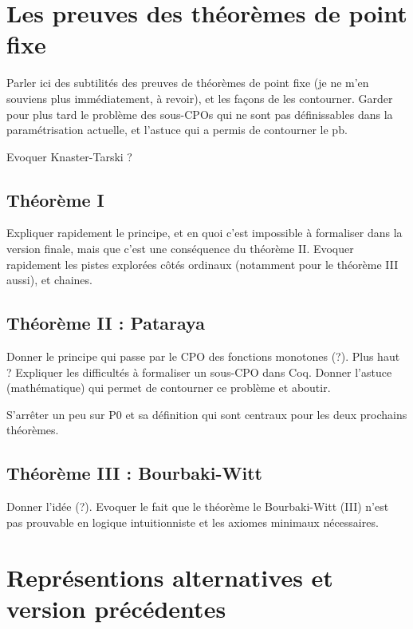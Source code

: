 \documentclass{article}
\theoremstyle{definition}
\begin{document}
\section{Les preuves des théorèmes de point fixe}


Parler ici des subtilités des preuves de théorèmes de point fixe (je ne m'en souviens plus immédiatement, à revoir), et les façons de les contourner. Garder pour plus tard le problème des sous-CPOs qui ne sont pas définissables dans la paramétrisation actuelle, et l'astuce qui a permis de contourner le pb.


Evoquer Knaster-Tarski ?

\subsection{Théorème I}

Expliquer rapidement le principe, et en quoi c'est impossible à formaliser dans la version finale, mais que c'est une conséquence du théorème II. Evoquer rapidement les pistes explorées côtés ordinaux (notamment pour le théorème III aussi), et chaines.

\subsection{Théorème II : Pataraya}

Donner le principe qui passe par le CPO des fonctions monotones (?). Plus haut ? Expliquer les difficultés à formaliser un sous-CPO dans Coq. Donner l'astuce (mathématique) qui permet de contourner ce problème et aboutir.

S'arrêter un peu sur P0 et sa définition qui sont centraux pour les deux prochains théorèmes.

\subsection{Théorème III : Bourbaki-Witt}

Donner l'idée (?). Evoquer le fait que le théorème le Bourbaki-Witt (III) n'est pas prouvable en logique intuitionniste et les axiomes minimaux nécessaires.



\section{Représentions alternatives et version précédentes}
\end{document}
